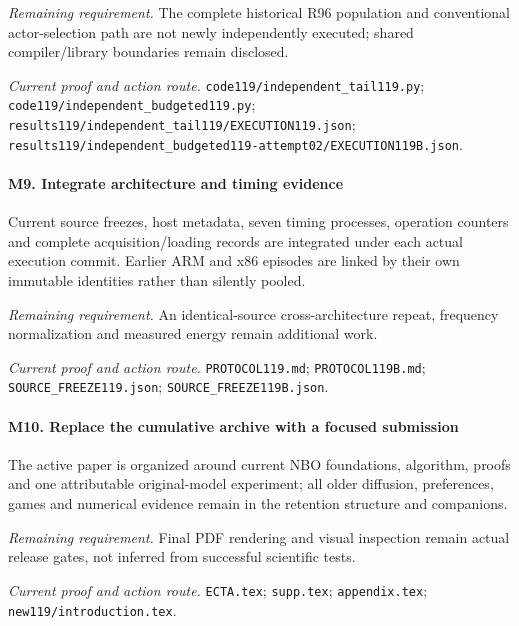 \par\emph{Remaining requirement.} The complete historical R96 population and conventional actor-selection path are not newly independently executed; shared compiler/\allowbreak{}library boundaries remain disclosed.

\par\emph{Current proof and action route.} \nolinkurl{code119/independent_tail119.py}; \nolinkurl{code119/independent_budgeted119.py}; \nolinkurl{results119/independent_tail119/EXECUTION119.json}; \nolinkurl{results119/independent_budgeted119-attempt02/EXECUTION119B.json}.

\paragraph{M9. Integrate architecture and timing evidence}

Current source freezes, host metadata, seven timing processes, operation counters and complete acquisition/\allowbreak{}loading records are integrated under each actual execution commit. Earlier ARM and x86 episodes are linked by their own immutable identities rather than silently pooled.

\par\emph{Remaining requirement.} An identical-source cross-architecture repeat, frequency normalization and measured energy remain additional work.

\par\emph{Current proof and action route.} \nolinkurl{PROTOCOL119.md}; \nolinkurl{PROTOCOL119B.md}; \nolinkurl{SOURCE_FREEZE119.json}; \nolinkurl{SOURCE_FREEZE119B.json}.

\paragraph{M10. Replace the cumulative archive with a focused submission}

The active paper is organized around current NBO foundations, algorithm, proofs and one attributable original-model experiment; all older diffusion, preferences, games and numerical evidence remain in the retention structure and companions.

\par\emph{Remaining requirement.} Final PDF rendering and visual inspection remain actual release gates, not inferred from successful scientific tests.

\par\emph{Current proof and action route.} \nolinkurl{ECTA.tex}; \nolinkurl{supp.tex}; \nolinkurl{appendix.tex}; \nolinkurl{new119/introduction.tex}.

